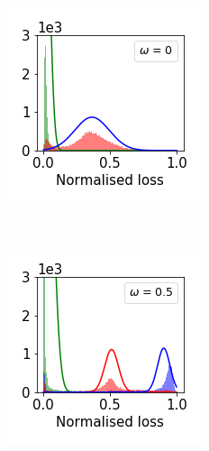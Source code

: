 \documentclass[12pt]{article}
\begin{document}
\begin{figure}[t]
\begin{subfigure}{.18\textwidth}
    \end{subfigure}
    \begin{subfigure}{.18\textwidth}
      \centering
      \includegraphics[width=\linewidth]{images/loss_dist/DM_0.6_1.00_imagenet32.png} 
    \end{subfigure}
    \\
    \begin{subfigure}{.18\textwidth}
      \centering
      \includegraphics[width=\linewidth]{images/loss_dist/EDM_0.6_0.50_cifar100.png} 

\end{subfigure}
\end{figure}
\end{document}
